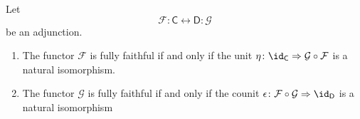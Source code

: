\documentclass[main.tex]{subfiles}
\begin{document}
\begin{proposition}
  \label{prop:conditions_for_fully_faithfulness_based_on_unit_or_counit}
  Let
  \begin{equation*}
    \mathcal{F} : \mathsf{C} \leftrightarrow \mathsf{D} : \mathcal{G}
  \end{equation*}
  be an adjunction.
  \begin{enumerate}
    \item The functor $\mathcal{F}$ is fully faithful if and only if the unit $\eta\colon \id_{\mathsf{C}} \Rightarrow \mathcal{G} \circ \mathcal{F}$ is a natural isomorphism.

    \item The functor $\mathcal{G}$ is fully faithful if and only if the counit $\epsilon\colon \mathcal{F} \circ \mathcal{G} \Rightarrow \id_{\mathsf{D}}$ is a natural isomorphism
  \end{enumerate}
\end{proposition}
\end{document}

